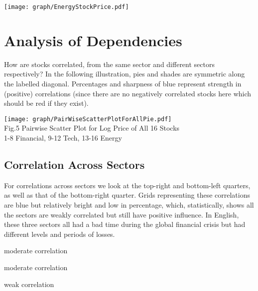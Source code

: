 \documentclass[11pt]{article}
\begin{document}
\begin{center}
\texttt{[image: graph/EnergyStockPrice.pdf]}
\end{center}
%
%


\section{Analysis of Dependencies}\vspace{-1em}
How are stocks correlated, from the same sector and different sectors respectively? In the following illustration, pies and shades are symmetric along the labelled diagonal. Percentages and sharpness of blue represent strength in (positive) correlations (since there are no negatively correlated stocks here which should be red if they exist). 
\vspace{-2em}
\begin{center}
  \texttt{[image: graph/PairWiseScatterPlotForAllPie.pdf]}\vspace{-1em}\\
  Fig.5 Pairwise Scatter Plot for Log Price of All 16 Stocks\\ 1-8 Financial, 9-12 Tech, 13-16 Energy
\end{center}

\subsection{Correlation Across Sectors}\vspace{-1em}
For correlations across sectors we look at the top-right and bottom-left quarters, as well as that of the bottom-right quarter. Grids representing these correlations are blue but relatively bright and low in percentage, which, statistically, shows all the sectors are weakly correlated but still have positive influence. In English, these three sectors all had a bad time during the global financial crisis but had different levels and periods of losses.
\begin{description}\vspace{-1em}
\item[Financial vs Technology] moderate correlation
\item[Technology vs Energy] moderate correlation
\item[Energy vs Financial] weak correlation
\end{description}
\end{document}
